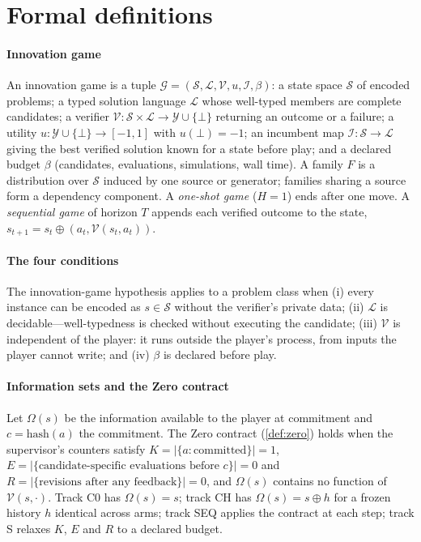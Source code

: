 \section{Formal definitions}
\label{app:formal}

\paragraph{Innovation game} An innovation game is a tuple
$\mathcal G=(\mathcal S,\mathcal L,\mathcal V,u,\mathcal I,\beta)$: a state space $\mathcal S$ of
encoded problems; a typed solution language $\mathcal L$ whose well-typed members are complete
candidates; a verifier $\mathcal V:\mathcal S\times\mathcal L\to\mathcal Y\cup\{\bot\}$ returning an
outcome or a failure; a utility $u:\mathcal Y\cup\{\bot\}\to[-1,1]$ with $u(\bot)=-1$; an incumbent
map $\mathcal I:\mathcal S\to\mathcal L$ giving the best verified solution known for a state before
play; and a declared budget $\beta$ (candidates, evaluations, simulations, wall time). A family
$F$ is a distribution over $\mathcal S$ induced by one source or generator; families sharing a source
form a dependency component. A \emph{one-shot game} ($H=1$) ends after one move. A \emph{sequential
game} of horizon $T$ appends each verified outcome to the state,
$s_{t+1}=s_t\oplus(a_t,\mathcal V(s_t,a_t))$.

\paragraph{The four conditions} The innovation-game hypothesis applies to a problem class when
(i) every instance can be encoded as $s\in\mathcal S$ without the verifier's private data;
(ii) $\mathcal L$ is decidable---well-typedness is checked without executing the candidate;
(iii) $\mathcal V$ is independent of the player: it runs outside the player's process, from inputs the
player cannot write; and (iv) $\beta$ is declared before play.

\paragraph{Information sets and the Zero contract} Let $\Omega(s)$ be the information available to the
player at commitment and $c=\mathrm{hash}(a)$ the commitment. The Zero contract
(\cref{def:zero}) holds when the supervisor's counters satisfy
$K=|\{a:\text{committed}\}|=1$, $E=|\{\text{candidate-specific evaluations before } c\}|=0$ and
$R=|\{\text{revisions after any feedback}\}|=0$, and $\Omega(s)$ contains no function of
$\mathcal V(s,\cdot)$. Track C0 has $\Omega(s)=s$; track CH has
$\Omega(s)=s\oplus h$ for a frozen history $h$ identical across arms; track SEQ applies the contract at
each step; track S relaxes $K$, $E$ and $R$ to a declared budget.

